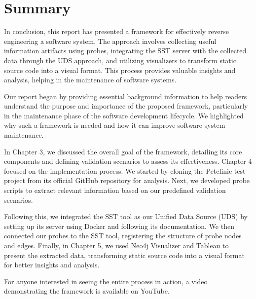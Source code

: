 \section{Summary}

In conclusion, this report has presented a framework for effectively reverse engineering a software system. The approach involves collecting useful information artifacts using probes, integrating the SST server with the collected data through the UDS approach, and utilizing visualizers to transform static source code into a visual format. This process provides valuable insights and analysis, helping in the maintenance of software systems.

Our report began by providing essential background information to help readers understand the purpose and importance of the proposed framework, particularly in the maintenance phase of the software development lifecycle. We highlighted why such a framework is needed and how it can improve software system maintenance.

In Chapter 3, we discussed the overall goal of the framework, detailing its core components and defining validation scenarios to assess its effectiveness. Chapter 4 focused on the implementation process. We started by cloning the Petclinic test project from its official GitHub repository for analysis. Next, we developed probe scripts to extract relevant information based on our predefined validation scenarios. 

Following this, we integrated the SST tool as our Unified Data Source (UDS) by setting up its server using Docker and following its documentation. We then connected our probes to the SST tool, registering the structure of probe nodes and edges. Finally, in Chapter 5, we used Neo4j Visualizer and Tableau to present the extracted data, transforming static source code into a visual format for better insights and analysis.

For anyone interested in seeing the entire process in action, a video demonstrating the framework is available on YouTube.